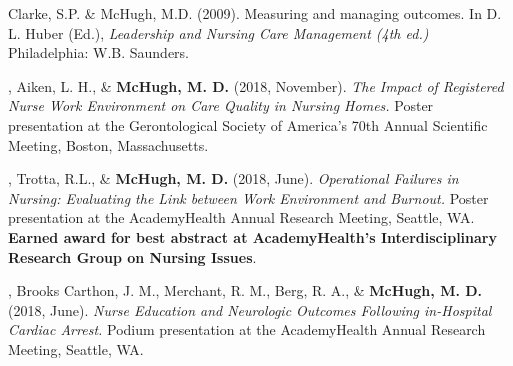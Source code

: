 \documentclass[10pt,]{article}
\begin{document}
{{{{{{{{{{{{{{{

\begin{hangparas}{.25in}{1}

\*Clarke, S.P. \& McHugh, M.D. (2009). Measuring and managing outcomes. In D. L. Huber (Ed.), {\textit {Leadership and Nursing Care Management (4th ed.)}} Philadelphia: W.B. Saunders.

\end{hangparas}

\vspace{4mm}


\begin{hangparas}{.25in}{1}

, Aiken, L. H., \& {\textbf {McHugh, M. D.}} (2018, November). {\textit {The Impact of Registered Nurse Work Environment on Care Quality in Nursing Homes.}} {\small{Poster presentation at the Gerontological Society of America's 70th Annual Scientific Meeting, Boston, Massachusetts.}}

\end{hangparas}

\vspace{4mm}

\begin{hangparas}{.25in}{1}

, Trotta, R.L., \& {\textbf {McHugh, M. D.}} (2018, June). {\textit {Operational Failures in Nursing: Evaluating the Link between Work Environment and Burnout.}} {\small{Poster presentation at the AcademyHealth Annual Research Meeting, Seattle, WA. {\textbf {Earned award for best abstract at AcademyHealth's Interdisciplinary Research Group on Nursing Issues}}.}}

\end{hangparas}

\vspace{4mm}

\begin{hangparas}{.25in}{1}

, Brooks Carthon, J. M., Merchant, R. M., Berg, R. A., \& {\textbf {McHugh, M. D.}} (2018, June). {\textit {Nurse Education and Neurologic Outcomes Following in-Hospital Cardiac Arrest.}} Podium presentation at the AcademyHealth Annual Research Meeting, Seattle, WA.


\end{hangparas}}}}}}}}}}}}}}}}
\end{document}
